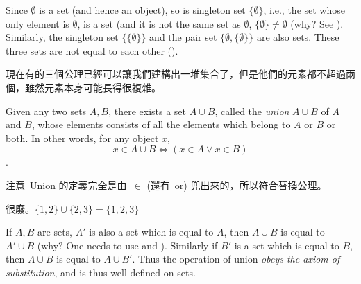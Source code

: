 \begin{example} \label{example 3.1.10}
Since \(\emptyset\) is a set (and hence an object), so is singleton set \(\{ \emptyset \}\), i.e., the set whose only element is \( \emptyset \), is a set (and it is not the same set as \( \emptyset \), \( \{ \emptyset \} \neq  \emptyset \) (why? See ). Similarly, the singleton set \( \{ \{ \emptyset \} \} \) and the pair set \( \{ \emptyset, \{ \emptyset \} \} \) are also sets. These three sets are not equal to each other ().
\end{example}

\begin{note}
現在有的三個公理已經可以讓我們建構出一堆集合了，但是他們的元素都不超過兩個，雖然元素本身可能長得很複雜。
\end{note}

\begin{axiom}  \label{axm 3.4}
Given any two sets \(A, B\), there exists a set \(A \cup B\), called the \emph{union} \(A \cup B\) of \(A\) and \(B\), whose elements consists of all the elements which belong to \(A\) or \(B\) or both. In other words, for any object \(x\),
\[
    x \in A \cup B \iff (x \in A \lor x \in B)
\].
\end{axiom}

\begin{note}
注意\ Union 的定義完全是由\ \( \in \) (還有\ or) 兜出來的，所以符合替換公理。
\end{note}

\begin{example}
很廢。\( \{1, 2\} \cup \{ 2, 3 \} = \{ 1, 2, 3 \} \)
\end{example}

\begin{remark} \label{remark 3.1.12}
If \(A, B\) are sets, \(A'\) is also a set which is equal to \(A\), then \(A \cup B\) is equal to \(A' \cup B\) (why?  One needs to use  and ). Similarly if \(B'\) is a set which is equal to \(B\), then \(A \cup B\) is equal to \(A \cup B'\). Thus the operation of union \emph{obeys the axiom of substitution}, and is thus well-defined on sets.
\end{remark}

